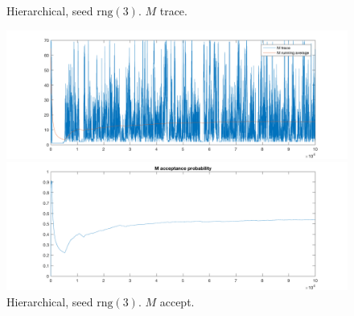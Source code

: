 \documentclass{siamart1116}
\begin{document}
\begin{figure}[!htb]
\begin{minipage}{0.48\textwidth}
    \centering
    \caption{\label{fig:moons_hier1_M_trace} Hierarchical, seed $\text{rng}(3)$. $M$ trace.}
    \includegraphics[width=\linewidth]{moons/hier1/M_trace.png}
\end{minipage} \hfill
\begin{minipage}{0.48\textwidth}
    \centering
    \caption{\label{fig:moons_hier1_M_accept} Hierarchical, seed $\text{rng}(3)$. $M$ accept.}
    \includegraphics[width=\linewidth]{moons/hier1/M_accept.png}
\end{minipage}
\end{figure}


\end{document}
